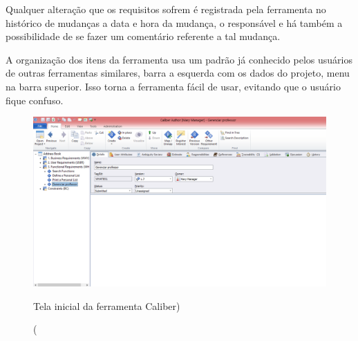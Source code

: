 Qualquer alteração que os requisitos sofrem é registrada pela ferramenta no histórico de mudanças a data e hora da mudança, o responsável e há também a possibilidade de se fazer um comentário referente a tal mudança.

A organização dos itens da ferramenta usa um padrão já conhecido pelos usuários de outras ferramentas similares, barra a esquerda com os dados do projeto, menu na barra superior. Isso torna a ferramenta fácil de usar, evitando que o usuário fique confuso.
\begin{figure}[!htb]
\centering
\includegraphics[scale=0.4]{figuras/caliber.png}
\caption(Tela inicial da ferramenta Caliber)
\end{figure}
